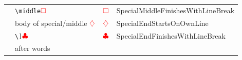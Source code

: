 \begin{longtable}{llll}
		                                       & \verb!\middle!$\color{red}\square$ & $\color{red}\square$            & SpecialMiddleFinishesWithLineBreak                                \\
		                                       & body of special/middle $\color{red}\diamondsuit$            & $\color{red}\diamondsuit$                   & SpecialEndStartsOnOwnLine                                         \\
		                                       & \verb!\]!$\color{red}\clubsuit$  & $\color{red}\clubsuit$             & SpecialEndFinishesWithLineBreak                                   \\
		                                       & after words                                             &                                         &                                                                   \\
		\bottomrule
	\end{longtable}
